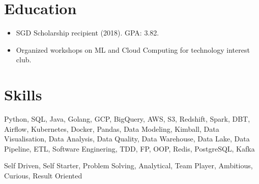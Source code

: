 \section{Education}
\begin{itemize}
  \item SGD Scholarship recipient (2018). GPA: 3.82.
  \item Organized workshops on ML and Cloud Computing for technology interest club.
\end{itemize}

\section{Skills}
\begin{description}
  \footnotesize{
  \item[Technical] Python, SQL, Java, Golang, GCP, BigQuery, AWS, S3, Redshift, Spark, DBT, Airflow, Kubernetes, Docker, Pandas, Data Modeling, Kimball, Data Visualisation, Data Analysis, Data Quality, Data Warehouse, Data Lake, Data Pipeline, ETL, Software Enginering, TDD, FP, OOP, Redis, PostgreSQL, Kafka
  \item[People]
    Self Driven, Self Starter, Problem Solving, Analytical, Team Player, Ambitious, Curious, Result Oriented
  }
\end{description}
